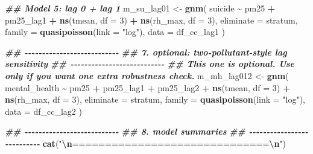 \documentclass[
]{article}
\newenvironment{Shaded}{\begin{snugshade}}{\end{snugshade}}
\newcommand{\AttributeTok}[1]{\textcolor[rgb]{0.13,0.29,0.53}{#1}}
\newcommand{\DecValTok}[1]{\textcolor[rgb]{0.00,0.00,0.81}{#1}}
\newcommand{\DocumentationTok}[1]{\textcolor[rgb]{0.56,0.35,0.01}{\textbf{\textit{#1}}}}
\newcommand{\FunctionTok}[1]{\textcolor[rgb]{0.13,0.29,0.53}{\textbf{#1}}}
\newcommand{\NormalTok}[1]{#1}
\newcommand{\OtherTok}[1]{\textcolor[rgb]{0.56,0.35,0.01}{#1}}
\newcommand{\SpecialCharTok}[1]{\textcolor[rgb]{0.81,0.36,0.00}{\textbf{#1}}}
\newcommand{\StringTok}[1]{\textcolor[rgb]{0.31,0.60,0.02}{#1}}
\begin{document}
\begin{Shaded}
\begin{Highlighting}[]
\DocumentationTok{\#\# Model 5: lag 0 + lag 1}
\NormalTok{m\_su\_lag01 }\OtherTok{\textless{}{-}} \FunctionTok{gnm}\NormalTok{(}
\NormalTok{  suicide }\SpecialCharTok{\textasciitilde{}}\NormalTok{ pm25 }\SpecialCharTok{+}\NormalTok{ pm25\_lag1 }\SpecialCharTok{+} \FunctionTok{ns}\NormalTok{(tmean, }\AttributeTok{df =} \DecValTok{3}\NormalTok{) }\SpecialCharTok{+} \FunctionTok{ns}\NormalTok{(rh\_max, }\AttributeTok{df =} \DecValTok{3}\NormalTok{),}
  \AttributeTok{eliminate =}\NormalTok{ stratum,}
  \AttributeTok{family =} \FunctionTok{quasipoisson}\NormalTok{(}\AttributeTok{link =} \StringTok{"log"}\NormalTok{),}
  \AttributeTok{data =}\NormalTok{ df\_cc\_lag1}
\NormalTok{)}
\end{Highlighting}
\end{Shaded}

\begin{Shaded}
\begin{Highlighting}[]
\DocumentationTok{\#\# {-}{-}{-}{-}{-}{-}{-}{-}{-}{-}{-}{-}{-}{-}{-}{-}{-}{-}{-}{-}{-}{-}{-}{-}{-}{-}{-}}
\DocumentationTok{\#\# 7. optional: two{-}pollutant{-}style lag sensitivity}
\DocumentationTok{\#\# {-}{-}{-}{-}{-}{-}{-}{-}{-}{-}{-}{-}{-}{-}{-}{-}{-}{-}{-}{-}{-}{-}{-}{-}{-}{-}{-}}
\DocumentationTok{\#\# This one is optional. Use only if you want one extra robustness check.}
\NormalTok{m\_mh\_lag012 }\OtherTok{\textless{}{-}} \FunctionTok{gnm}\NormalTok{(}
\NormalTok{  mental\_health }\SpecialCharTok{\textasciitilde{}}\NormalTok{ pm25 }\SpecialCharTok{+}\NormalTok{ pm25\_lag1 }\SpecialCharTok{+}\NormalTok{ pm25\_lag2 }\SpecialCharTok{+}
    \FunctionTok{ns}\NormalTok{(tmean, }\AttributeTok{df =} \DecValTok{3}\NormalTok{) }\SpecialCharTok{+} \FunctionTok{ns}\NormalTok{(rh\_max, }\AttributeTok{df =} \DecValTok{3}\NormalTok{),}
  \AttributeTok{eliminate =}\NormalTok{ stratum,}
  \AttributeTok{family =} \FunctionTok{quasipoisson}\NormalTok{(}\AttributeTok{link =} \StringTok{"log"}\NormalTok{),}
  \AttributeTok{data =}\NormalTok{ df\_cc\_lag2}
\NormalTok{)}
\end{Highlighting}
\end{Shaded}

\begin{Shaded}
\begin{Highlighting}[]
\DocumentationTok{\#\# {-}{-}{-}{-}{-}{-}{-}{-}{-}{-}{-}{-}{-}{-}{-}{-}{-}{-}{-}{-}{-}{-}{-}{-}{-}{-}{-}}
\DocumentationTok{\#\# 8. model summaries}
\DocumentationTok{\#\# {-}{-}{-}{-}{-}{-}{-}{-}{-}{-}{-}{-}{-}{-}{-}{-}{-}{-}{-}{-}{-}{-}{-}{-}{-}{-}{-}}
\FunctionTok{cat}\NormalTok{(}\StringTok{"}\SpecialCharTok{\textbackslash{}n}\StringTok{==============================}\SpecialCharTok{\textbackslash{}n}\StringTok{"}\NormalTok{)}
\end{Highlighting}
\end{Shaded}
\end{document}
